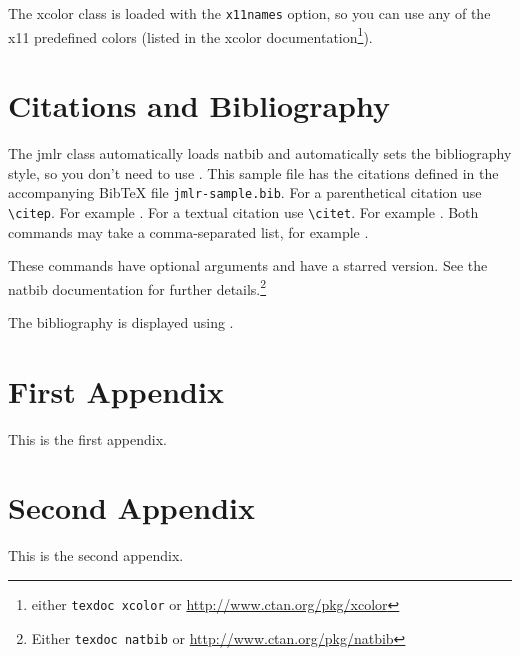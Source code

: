 \documentclass[tablecaption=bottom,wcp]{jmlr} %
\begin{document}
The \textsf{xcolor} class is loaded with the \texttt{x11names}
option, so you can use any of the x11 predefined colors (listed
in the \textsf{xcolor} documentation\footnote{either
  \texttt{texdoc xcolor} or \url{http://www.ctan.org/pkg/xcolor}}).

\section{Citations and Bibliography}
\label{sec:cite}

The \textsf{jmlr} class automatically loads \textsf{natbib}
and automatically sets the bibliography style, so you don't need to
use \verb||.
This sample file has the citations defined in the accompanying
BibTeX file \texttt{jmlr-sample.bib}. For a parenthetical
citation use \verb|\citep|. For example
\citep{guyon-elisseeff-03}. For a textual citation use
\verb|\citet|. For example \citet{guyon2007causalreport}.
Both commands may take a comma-separated list, for example
\citet{guyon-elisseeff-03,guyon2007causalreport}.

These commands have optional arguments and have a starred
version. See the \textsf{natbib} documentation for further
details.\footnote{Either \texttt{texdoc natbib} or
  \url{http://www.ctan.org/pkg/natbib}}

The bibliography is displayed using \verb||.




\appendix

\section{First Appendix}\label{apd:first}

This is the first appendix.

\section{Second Appendix}\label{apd:second}

This is the second appendix.
\end{document}
